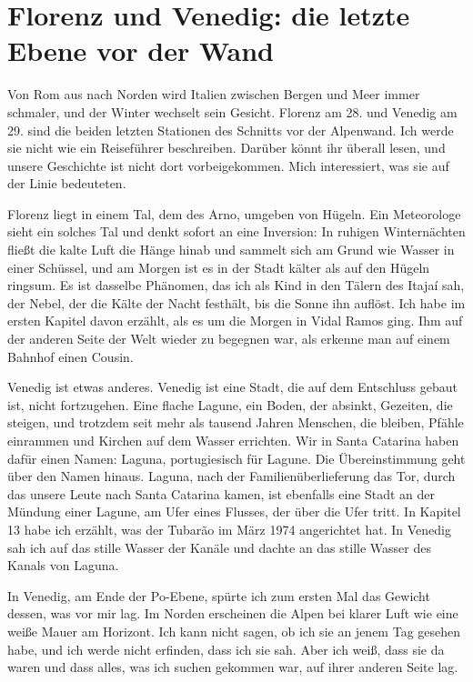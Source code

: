 \documentclass[
  ngerman,
  11pt,
  openany]{book}
\begin{document}
\section{Florenz und Venedig: die letzte Ebene vor der
Wand}\label{florenz-und-venedig-die-letzte-ebene-vor-der-wand}

Von Rom aus nach Norden wird Italien zwischen Bergen und Meer immer
schmaler, und der Winter wechselt sein Gesicht. Florenz am 28. und
Venedig am 29. sind die beiden letzten Stationen des Schnitts vor der
Alpenwand. Ich werde sie nicht wie ein Reiseführer beschreiben. Darüber
könnt ihr überall lesen, und unsere Geschichte ist nicht dort
vorbeigekommen. Mich interessiert, was sie auf der Linie bedeuteten.

Florenz liegt in einem Tal, dem des Arno, umgeben von Hügeln. Ein
Meteorologe sieht ein solches Tal und denkt sofort an eine Inversion: In
ruhigen Winternächten fließt die kalte Luft die Hänge hinab und sammelt
sich am Grund wie Wasser in einer Schüssel, und am Morgen ist es in der
Stadt kälter als auf den Hügeln ringsum. Es ist dasselbe Phänomen, das
ich als Kind in den Tälern des Itajaí sah, der Nebel, der die Kälte der
Nacht festhält, bis die Sonne ihn auflöst. Ich habe im ersten Kapitel
davon erzählt, als es um die Morgen in Vidal Ramos ging. Ihm auf der
anderen Seite der Welt wieder zu begegnen war, als erkenne man auf einem
Bahnhof einen Cousin.

Venedig ist etwas anderes. Venedig ist eine Stadt, die auf dem
Entschluss gebaut ist, nicht fortzugehen. Eine flache Lagune, ein Boden,
der absinkt, Gezeiten, die steigen, und trotzdem seit mehr als tausend
Jahren Menschen, die bleiben, Pfähle einrammen und Kirchen auf dem
Wasser errichten. Wir in Santa Catarina haben dafür einen Namen: Laguna,
portugiesisch für Lagune. Die Übereinstimmung geht über den Namen
hinaus. Laguna, nach der Familienüberlieferung das Tor, durch das unsere
Leute nach Santa Catarina kamen, ist ebenfalls eine Stadt an der Mündung
einer Lagune, am Ufer eines Flusses, der über die Ufer tritt. In Kapitel
13 habe ich erzählt, was der Tubarão im März 1974 angerichtet hat. In
Venedig sah ich auf das stille Wasser der Kanäle und dachte an das
stille Wasser des Kanals von Laguna.

In Venedig, am Ende der Po-Ebene, spürte ich zum ersten Mal das Gewicht
dessen, was vor mir lag. Im Norden erscheinen die Alpen bei klarer Luft
wie eine weiße Mauer am Horizont. Ich kann nicht sagen, ob ich sie an
jenem Tag gesehen habe, und ich werde nicht erfinden, dass ich sie sah.
Aber ich weiß, dass sie da waren und dass alles, was ich suchen gekommen
war, auf ihrer anderen Seite lag.
\end{document}
